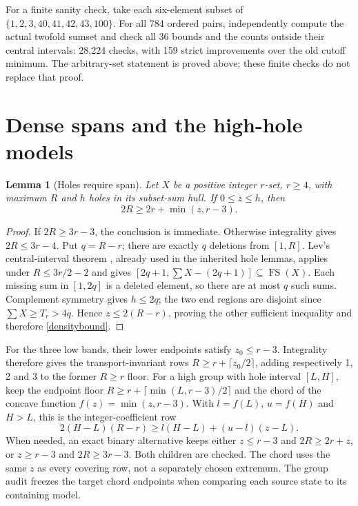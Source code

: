 \documentclass[11pt,a4paper]{article}
\newcommand{\FS}{\operatorname{FS}}
\newtheorem{lemma}[theorem]{Lemma}
\begin{document}
For a finite sanity check, take each six-element subset of
$\{1,2,3,40,41,42,43,100\}$. For all 784 ordered pairs, independently
compute the actual twofold sumset and check all 36 bounds and the counts
outside their central intervals: 28,224 checks, with 159 strict
improvements over the old cutoff minimum. The arbitrary-set
statement is proved above; these finite checks do not replace that proof.

\section{Dense spans and the high-hole models}
\begin{lemma}[Holes require span]\label{density}
Let $X$ be a positive integer $r$-set, $r\ge4$, with maximum $R$ and
$h$ holes in its subset-sum hull. If $0\le z\le h$, then
\begin{equation}\label{densitybound}
 2R\ge2r+\min(z,r-3).
\end{equation}
\end{lemma}
\begin{proof}
If $2R\ge3r-3$, the conclusion is immediate. Otherwise integrality gives
$2R\le3r-4$. Put $q=R-r$; there are exactly $q$ deletions from $[1,R]$.
Lev's central-interval theorem \cite[Theorem 1]{Lev1998}, already used
in the inherited hole lemmas, applies under $R\le3r/2-2$ and gives
$[2q+1,\sum X-(2q+1)]\subseteq\FS(X)$.
Each missing sum in $[1,2q]$ is a deleted element, so there are at most
$q$ such sums. Complement symmetry gives $h\le2q$; the two end regions
are disjoint since $\sum X\ge T_r>4q$. Hence $z\le2(R-r)$, proving
the other sufficient inequality and therefore \eqref{densitybound}.
\end{proof}
For the three low bands, their lower endpoints satisfy $z_0\le r-3$.
Integrality therefore gives the transport-invariant rows
$R\ge r+\lceil z_0/2\rceil$, adding respectively 1, 2 and 3 to the
former $R\ge r$ floor. For a high group with hole interval $[L,H]$, keep
the endpoint floor $R\ge r+\lceil\min(L,r-3)/2\rceil$ and the chord
of the concave function $f(z)=\min(z,r-3)$. With
$l=f(L)$, $u=f(H)$ and $H>L$, this is the integer-coefficient row
\[
 2(H-L)(R-r)\ge l(H-L)+(u-l)(z-L).
\]
When needed, an exact binary alternative keeps either
$z\le r-3$ and $2R\ge2r+z$, or
$z\ge r-3$ and $2R\ge3r-3$. Both children are checked.
The chord uses the same $z$ as every covering row, not a separately
chosen extremum. The group audit freezes the target chord endpoints
when comparing each source state to its containing model.
\end{document}
